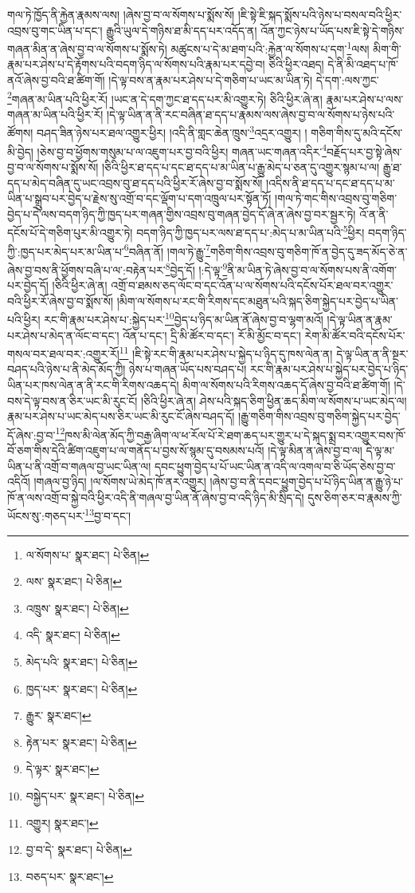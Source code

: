 གལ་ཏེ་ཁྱོད་ནི་རྐྱེན་རྣམས་ལས། །ཞེས་བྱ་བ་ལ་སོགས་པ་སྨོས་སོ། །ཇི་སྟེ་ཇི་སྐད་སྨོས་པའི་ཉེས་པ་བསལ་བའི་ཕྱིར་འབྲས་བུ་གང་ཡིན་པ་དང་། རྒྱུའི་ཡུལ་དེ་གཉིས་ཐ་མི་དད་པར་འདོད་ན། འོན་ཀྱང་ཉེས་པ་ཡོད་པས་ཇི་སྟེ་དེ་གཉིས་གཞན་མིན་ན་ཞེས་བྱ་བ་ལ་སོགས་པ་སྨོས་ཏེ། མཚུངས་པ་དེ་མ་ཐག་པའི་:རྐྱེན་ལ་སོགས་པ་དག་\footnote{ལ་སོགས་པ་  སྣར་ཐང་།  པེ་ཅིན། }ལས། མིག་གི་རྣམ་པར་ཤེས་པ་དེ་རྟོགས་པའི་བདག་ཉིད་ལ་སོགས་པའི་རྣམ་པར་དབྱེ་བ། ཅིའི་ཕྱིར་འཐད། དེ་ནི་མི་འཐད་པ་ཁོ་ནའོ་ཞེས་བྱ་བའི་ཐ་ཚིག་གོ། །དེ་ལྟ་བས་ན་རྣམ་པར་ཤེས་པ་དེ་གཅིག་པ་ཡང་མ་ཡིན་ཏེ། དེ་དག་:ལས་ཀྱང་\footnote{ལས་  སྣར་ཐང་།  པེ་ཅིན། }གཞན་མ་ཡིན་པའི་ཕྱིར་རོ། །ཡང་ན་དེ་དག་ཀྱང་ཐ་དད་པར་མི་འགྱུར་ཏེ། ཅིའི་ཕྱིར་ཞེ་ན། རྣམ་པར་ཤེས་པ་ལས་གཞན་མ་ཡིན་པའི་ཕྱིར་རོ། །དེ་ལྟ་ཡིན་ན་ནི་རང་བཞིན་ཐ་དད་པ་རྣམས་ལས་ཞེས་བྱ་བ་ལ་སོགས་པ་ཉེས་པའི་ཚོགས། བཤད་ཟིན་ཉེས་པར་ཐལ་འགྱུར་ཕྱིར། །འདི་ནི་གླང་ཆེན་ཁྲུས་\footnote{འཁྲུས་  སྣར་ཐང་།  པེ་ཅིན། }འདྲར་འགྱུར། །
གཅིག་གིས་དུ་མའི་དངོས་མི་བྱེད། །ཅེས་བྱ་བ་ཕྱོགས་གསུམ་པ་ལ་འཇུག་པར་བྱ་བའི་ཕྱིར། གཞན་ཡང་གཞན་འདིར་\footnote{འདི་  སྣར་ཐང་།  པེ་ཅིན། }བརྗོད་པར་བྱ་སྟེ་ཞེས་བྱ་བ་ལ་སོགས་པ་སྨོས་སོ། །ཅིའི་ཕྱིར་ཐ་དད་པ་དང་ཐ་དད་པ་མ་ཡིན་པ་རྒྱུ་མེད་པ་ཅན་དུ་འགྱུར་སྙམ་པ་ལ། རྒྱུ་ཐ་དད་པ་མེད་བཞིན་དུ་ཡང་འབྲས་བུ་ཐ་དད་པའི་ཕྱིར་རོ་ཞེས་བྱ་བ་སྨོས་སོ། །འདིས་ནི་ཐ་དད་པ་དང་ཐ་དད་པ་མ་ཡིན་པ་སྒྲུབ་པར་བྱེད་པ་རྗེས་སུ་འགྲོ་བ་དང་ལྡོག་པ་དག་འཁྲུལ་པར་སྟོན་ཏོ། །གལ་ཏེ་གང་གིས་འབྲས་བུ་གཅིག་བྱེད་པ་དེ་ལས་བདག་ཉིད་ཀྱི་ཁྱད་པར་གཞན་གྱིས་འབྲས་བུ་གཞན་བྱེད་དོ་ཞེ་ན་ཞེས་བྱ་བར་སྦྱར་ཏེ། འོ་ན་ནི་དངོས་པོ་དེ་གཅིག་པུར་མི་འགྱུར་ཏེ། བདག་ཉིད་ཀྱི་ཁྱད་པར་ལས་ཐ་དད་པ་:མེད་པ་མ་ཡིན་པའི་\footnote{མེད་པའི་  སྣར་ཐང་།  པེ་ཅིན། }ཕྱིར། བདག་ཉིད་ཀྱི་:ཁྱད་པར་མེད་པར་མ་ཡིན་པ་\footnote{ཁྱད་པར་  སྣར་ཐང་།  པེ་ཅིན། }བཞིན་ནོ། །གལ་ཏེ་རྒྱུ་\footnote{རྒྱུར་  སྣར་ཐང་། }གཅིག་གིས་འབྲས་བུ་གཅིག་ཁོ་ན་བྱེད་དུ་ཟད་མོད་ཅེ་ན་ཞེས་བྱ་བས་ནི་ཕྱོགས་བཞི་པ་ལ་:བརྟེན་པར་\footnote{རྟེན་པར་  སྣར་ཐང་།  པེ་ཅིན། }བྱེད་དོ། །:དེ་ལྟ་\footnote{དེ་ལྟར་  སྣར་ཐང་། }ནི་མ་ཡིན་ཏེ་ཞེས་བྱ་བ་ལ་སོགས་པས་ནི་འགོག་པར་བྱེད་དོ། །ཅིའི་ཕྱིར་ཞེ་ན། འགྲོ་བ་ཐམས་ཅད་ལོང་བ་དང་འོན་པ་ལ་སོགས་པའི་དངོས་པོར་ཐལ་བར་འགྱུར་བའི་ཕྱིར་རོ་ཞེས་བྱ་བ་སྨོས་སོ། །མིག་ལ་སོགས་པ་རང་གི་རིགས་དང་མཐུན་པའི་སྐད་ཅིག་སྐྱེད་པར་བྱེད་པ་ཡིན་པའི་ཕྱིར། རང་གི་རྣམ་པར་ཤེས་པ་:སྐྱེད་པར་\footnote{བསྐྱེད་པར་  སྣར་ཐང་།  པེ་ཅིན། }བྱེད་པ་ཉིད་མ་ཡིན་ནོ་ཞེས་བྱ་བ་ལྷག་མའོ། །དེ་ལྟ་ཡིན་ན་རྣམ་པར་ཤེས་པ་མེད་ན་ལོང་བ་དང་། འོན་པ་དང་། དྲི་མི་ཚོར་བ་དང་། རོ་མི་མྱོང་བ་དང་། རེག་མི་ཚོར་བའི་དངོས་པོར་གསལ་བར་ཐལ་བར་:འགྱུར་རོ།\footnote{འགྱུར།  སྣར་ཐང་། } །ཇི་སྟེ་རང་གི་རྣམ་པར་ཤེས་པ་སྐྱེད་པ་ཉིད་དུ་ཁས་ལེན་ན། དེ་ལྟ་ཡིན་ན་ནི་སྔར་བཤད་པའི་ཉེས་པ་ནི་མེད་མོད་ཀྱི། ཉེས་པ་གཞན་ཡོད་པས་བཤད་པ། རང་གི་རྣམ་པར་ཤེས་པ་སྐྱེད་པར་བྱེད་པ་ཉིད་ཡིན་པར་ཁས་ལེན་ན་ནི་རང་གི་རིགས་འཆད་དེ། མིག་ལ་སོགས་པའི་རིགས་འཆད་དོ་ཞེས་བྱ་བའི་ཐ་ཚིག་གོ། །དེ་བས་དེ་ལྟ་བས་ན་ཅིར་ཡང་མི་རུང་ངོ། །ཅིའི་ཕྱིར་ཞེ་ན། ཤེས་པའི་སྐད་ཅིག་ཕྱིན་ཆད་མིག་ལ་སོགས་པ་ཡང་མེད་ལ། རྣམ་པར་ཤེས་པ་ཡང་མེད་པས་ཅིར་ཡང་མི་རུང་ངོ་ཞེས་བཤད་དོ། །རྒྱུ་གཅིག་གིས་འབྲས་བུ་གཅིག་སྐྱེད་པར་བྱེད་དོ་ཞེས་:བྱ་བ་\footnote{བྱ་བ་དེ་  སྣར་ཐང་།  པེ་ཅིན། }ཁས་མི་ལེན་མོད་ཀྱི་བརྒྱ་ཞིག་ལ་ཕ་རོལ་པོ་རེ་ཐག་ཆད་པར་གྱུར་པ་དེ་སྐད་སྨྲ་བར་འགྱུར་བས་ཁོ་བོ་ཅག་གིས་དེའི་ཚིག་འཇུག་པ་ལ་གནོད་པ་བྱས་སོ་སྙམ་དུ་བསམས་པའོ། །དེ་ལྟ་མིན་ན་ཞེས་བྱ་བ་ལ། དེ་ལྟ་མ་ཡིན་པ་ནི་འགྲོ་བ་གཞལ་བྱ་ཡང་ཡིན་ལ། དབང་ཕྱུག་བྱེད་པ་པོ་ཡང་ཡིན་ན་འདི་ལ་འགལ་བ་ཅི་ཡོད་ཅེས་བྱ་བ་འདིའོ། །གཞལ་བྱ་ཉིད། །ལ་སོགས་ཡེ་མེད་ཁོ་ནར་འགྱུར། །ཞེས་བྱ་བ་ནི་དབང་ཕྱུག་བྱེད་པ་པོ་ཉིད་ཡིན་ན་རྒྱུ་ཉེ་པ་ཁོ་ན་ལས་འགྲོ་བ་སྐྱེ་བའི་ཕྱིར་འདི་ནི་གཞལ་བྱ་ཡིན་ནོ་ཞེས་བྱ་བ་འདི་ཉིད་མི་སྲིད་དེ། དུས་ཅིག་ཅར་བ་རྣམས་ཀྱི་ཡོངས་སུ་:གཅད་པར་\footnote{བཅད་པར་  སྣར་ཐང་། }བྱ་བ་དང་། 